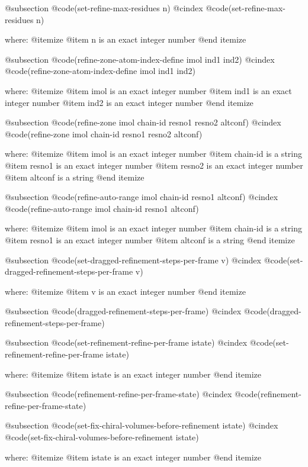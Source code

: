 @subsection @code{(set-refine-max-residues n)}
@cindex @code{(set-refine-max-residues n)}
 
where: 
 @itemize 
     @item n is an exact integer number
 @end itemize


@subsection @code{(refine-zone-atom-index-define imol ind1 ind2)}
@cindex @code{(refine-zone-atom-index-define imol ind1 ind2)}
 
where: 
 @itemize 
     @item imol is an exact integer number
     @item ind1 is an exact integer number
     @item ind2 is an exact integer number
 @end itemize


@subsection @code{(refine-zone imol chain-id resno1 resno2 altconf)}
@cindex @code{(refine-zone imol chain-id resno1 resno2 altconf)}
 
where: 
 @itemize 
     @item imol is an exact integer number
     @item chain-id is a string
     @item resno1 is an exact integer number
     @item resno2 is an exact integer number
     @item altconf is a string
 @end itemize


@subsection @code{(refine-auto-range imol chain-id resno1 altconf)}
@cindex @code{(refine-auto-range imol chain-id resno1 altconf)}
 
where: 
 @itemize 
     @item imol is an exact integer number
     @item chain-id is a string
     @item resno1 is an exact integer number
     @item altconf is a string
 @end itemize


@subsection @code{(set-dragged-refinement-steps-per-frame v)}
@cindex @code{(set-dragged-refinement-steps-per-frame v)}
 
where: 
 @itemize 
     @item v is an exact integer number
 @end itemize


@subsection @code{(dragged-refinement-steps-per-frame)}
@cindex @code{(dragged-refinement-steps-per-frame)}
 
@subsection @code{(set-refinement-refine-per-frame istate)}
@cindex @code{(set-refinement-refine-per-frame istate)}
 
where: 
 @itemize 
     @item istate is an exact integer number
 @end itemize


@subsection @code{(refinement-refine-per-frame-state)}
@cindex @code{(refinement-refine-per-frame-state)}
 
@subsection @code{(set-fix-chiral-volumes-before-refinement istate)}
@cindex @code{(set-fix-chiral-volumes-before-refinement istate)}
 
where: 
 @itemize 
     @item istate is an exact integer number
 @end itemize


